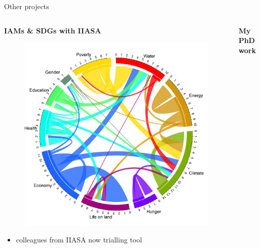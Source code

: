 \documentclass[9pt]{beamer}
\begin{document}
\begin{frame}[t]{Other projects}

\normalsize

\begin{columns}[t]
	\begin{column}{0.33\linewidth}
		\centering \textbf{ IAMs \& SDGs with IIASA}
		\begin{figure}
			\includegraphics[width=\linewidth]{images/wheel}
		\end{figure}
		\begin{itemize}
			\item colleagues from IIASA now trialling tool
		\end{itemize}
	\end{column}
	\begin{column}{0.33\linewidth}
		\centering \textbf{My PhD work}
		

\end{column}
\end{columns}
\end{frame}
\end{document}
